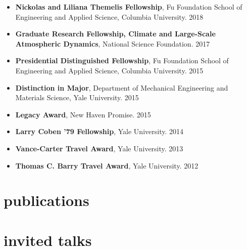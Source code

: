 \documentclass[11pt,article,oneside]{memoir}
\begin{document}
\begin{itemize}[label={}]

  \item \textbf{Nickolas and Liliana Themelis Fellowship}, Fu Foundation School of Engineering and Applied Science, Columbia University. 2018

  \item \textbf{Graduate Research Fellowship, Climate and Large-Scale Atmospheric Dynamics}, National Science Foundation. 2017

  \item \textbf{Presidential Distinguished Fellowship}, Fu Foundation School of Engineering and Applied Science, Columbia University. 2015

  \item \textbf{Distinction in Major}, Department of Mechanical Engineering and Materials Science, Yale University. 2015

  \item \textbf{Legacy Award}, New Haven Promise. 2015

  \item \textbf{Larry Coben ’79 Fellowship}, Yale University. 2014

  \item \textbf{Vance-Carter Travel Award}, Yale University. 2013

  \item \textbf{Thomas C. Barry Travel Award}, Yale University. 2012

\end{itemize}

\section{publications}

\printbibliography[type=article, title={Peer-Reviewed Journal Articles}, heading=subbibliography]

\printbibliography[type=unpublished, title={Articles Under Review or Forthcoming}, heading=subbibliography]

\printbibliography[type=thesis, title={Dissertation}, heading=subbibliography]

\printbibliography[type=inproceedings, title={Conference Proceedings}, heading=subbibliography]


\section{invited talks}
\end{document}
